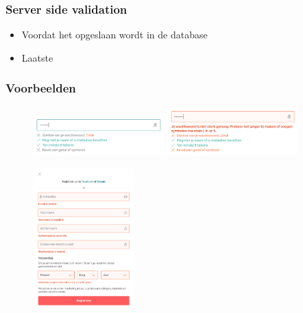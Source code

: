 \documentclass{article}
\begin{document}
\subsubsection{Server side validation}
\begin{itemize}
    \item Voordat het opgeslaan wordt in de database
    \item Laatste
\end{itemize}

\subsubsection{Voorbeelden}
\begin{figure}[H]
    \centering
    \includegraphics[width=0.45\textwidth]{validation1.png}
    \includegraphics[width=0.45\textwidth]{validation2.png}
    \caption{}
\end{figure}

\begin{figure}[H]
    \centering
    \includegraphics[width=0.35\textwidth]{validation3.png}
    \caption{}
\end{figure}
\end{document}

